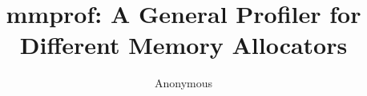 
\usepackage{times}
\usepackage{datetime}
\usepackage{balance}  %
\usepackage{graphics} %
\usepackage{url}
\usepackage{hyperref}
\usepackage{txfonts}
\usepackage{pslatex}    
\usepackage{pifont}
\usepackage{multirow}
\usepackage{makecell}
\usepackage[justification=centering]{caption}
\usepackage{xspace}
\usepackage{comment}
\usepackage{listings}
\usepackage{tikz}
\usepackage{calc}
\usepackage{fancyvrb}
\usepackage{xcolor}
\usepackage{flushend}
\usepackage{wrapfig}

\newcommand{\cmark}{\ding{51}}%
\newcommand{\xmark}{\ding{55}}%

\newcommand{\eurosyssubmissionnumber}{\#147, 12 pages}
\newcommand{\todo}[1]{{\color{red}\bfseries [[#1]]}}
\newcommand{\TP}[1]{{\color{red}\bfseries [[#1]]}}

\newcommand{\specialcell}[2][c]{%
  \begin{tabular}[#1]{@{}c@{}}#2\end{tabular}}
\newcommand{\OB}{\texttt{OpenBSD}}
\newcommand{\DieHarder}{\texttt{DieHarder}}
\newcommand{\DL}{\texttt{DLmalloc}}
\newcommand{\JE}{\texttt{jemalloc}}
\newcommand{\MP}{\texttt{mmprof}}

\def\bibfont{\normalfont}
\newcommand{\RN}[1]{\uppercase\expandafter{\romannumeral #1\relax}}




\title{mmprof: A General Profiler for Different Memory Allocators}
\author{Anonymous}


\maketitle











%

{


}


